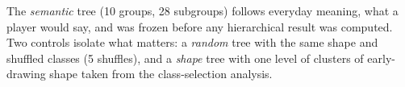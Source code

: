 The \emph{semantic} tree (10 groups, 28 subgroups) follows everyday meaning, what a player would
say, and was frozen before any hierarchical result was computed. Two controls isolate what
matters: a \emph{random} tree with the same shape and shuffled classes (5 shuffles), and a
\emph{shape} tree with one level of clusters of early-drawing shape taken from the class-selection
analysis.
